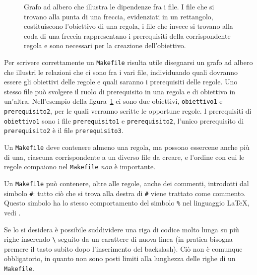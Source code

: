 \begin{figure}
  \centering
  \caption{Grafo ad albero che illustra le dipendenze fra i file.  I file che si
    trovano alla punta di una freccia, evidenziati in un rettangolo,
    costituiscono l'obiettivo di una regola, i file che invece si trovano alla
    coda di una freccia rappresentano i prerequisiti della corrispondente
    regola e sono necessari per la creazione dell'obiettivo.}
  \label{fig:grafo-albero1}
\end{figure}
Per scrivere correttamente un \verb|Makefile| risulta utile disegnarsi un grafo
ad albero che illustri le relazioni che ci sono fra i vari file, individuando
quali dovranno essere gli obiettivi delle regole e quali saranno i prerequisiti
delle regole.  Uno stesso file può svolgere il ruolo di prerequisito in una
regola e di obiettivo in un'altra.  Nell'esempio della
figura~\ref{fig:grafo-albero1} ci sono due obiettivi, \verb|obiettivo1| e
\verb|prerequisito2|, per le quali verranno scritte le opportune regole.  I
prerequisiti di \verb|obiettivo1| sono i file \verb|prerequisito1| e
\verb|prerequisito2|, l'unico prerequisito di \verb|prerequisito2| è il file
\verb|prerequisito3|.

Un \verb|Makefile| deve contenere almeno una regola, ma possono essercene anche
più di una, ciascuna corrispondente a un diverso file da creare, e l'ordine con
cui le regole compaiono nel \verb|Makefile| \emph{non} è importante.

Un \verb|Makefile| può contenere, oltre alle regole, anche dei commenti,
introdotti dal simbolo \verb|#|: tutto ciò che si trova alla destra di \verb|#|
viene trattato come commento.  Questo simbolo ha lo stesso comportamento del
simbolo \verb|%| nel linguaggio \LaTeX{}, vedi \textcite[26]{pantieri:latex}.

Se lo si desidera è possibile suddividere una riga di codice molto lunga su più
righe inserendo \verb|\| seguito da un carattere di nuova linea (in pratica
bisogna premere il tasto  subito dopo l'inserimento del
backslash).  Ciò non è comunque obbligatorio, in quanto non sono posti limiti
alla lunghezza delle righe di un \verb|Makefile|.



